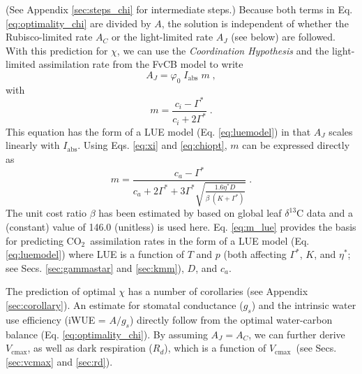 \documentclass{myreport}
\newcommand{\coo}{CO$_2$}
\newcommand{\vcmax}{$V_{\text{cmax}}$}
\begin{document}
(See Appendix \ref{sec:steps_chi} for intermediate steps.) Because both terms in Eq. \ref{eq:optimality_chi} are divided by $A$, the solution is independent of whether the Rubisco-limited rate $A_C$ or the light-limited rate $A_J$ (see below) are followed. With this prediction for $\chi$, we can use the \textit{Coordination Hypothesis} \citep{chen93, haxeltine96, maire12po} and the light-limited assimilation rate from the FvCB model to write
\begin{equation}
\label{eq:aj}
        A_J = \varphi_0 \; I_{\mathrm{abs}}\;m \;,
\end{equation}
with
\begin{equation}
\label{eq:m_co2limitation}
    m = \frac{c_i - \Gamma^{\ast}}{c_i + 2\Gamma^{\ast}}\;.
\end{equation}
This equation has the form of a LUE model (Eq. \ref{eq:luemodel}) in that $A_J$ scales linearly with $I_{\mathrm{abs}}$. Using Eqs. \ref{eq:xi} and \ref{eq:chiopt}, $m$ can be expressed directly as
\begin{equation}
\label{eq:m_lue}
    m = \frac{c_a - \Gamma^{\ast}}{c_a + 2 \Gamma^{\ast} + 3 \Gamma^{\ast} \sqrt{\frac{1.6 \eta^{\ast} D }{\beta\;(K+\Gamma^{\ast})}}} \;.
\end{equation}
The unit cost ratio $\beta$ has been estimated by \citet{wang17natpl} based on global leaf $\delta^{13}$C data and a (constant) value of 146.0 (unitless) is used here. Eq. \ref{eq:m_lue} provides the basis for predicting \coo\ assimilation rates in the form of a LUE model (Eq. \ref{eq:luemodel}) where LUE is a function of $T$ and $p$ (both affecting $\Gamma^{\ast}$, $K$, and $\eta^\ast$; see Secs. \ref{sec:gammastar} and \ref{sec:kmm}), $D$, and $c_a$.  

The prediction of optimal $\chi$ has a number of corollaries (see Appendix \ref{sec:corollary}). An estimate for stomatal conductance ($g_s$) and the intrinsic water use efficiency (iWUE = $A/g_s$) directly follow from the optimal water-carbon balance (Eq. \ref{eq:optimality_chi}). By assuming $A_J=A_C$, we can further derive \vcmax , as well as dark respiration ($R_d$), which is a function of \vcmax\ (see Secs. \ref{sec:vcmax} and \ref{sec:rd}).
\end{document}
